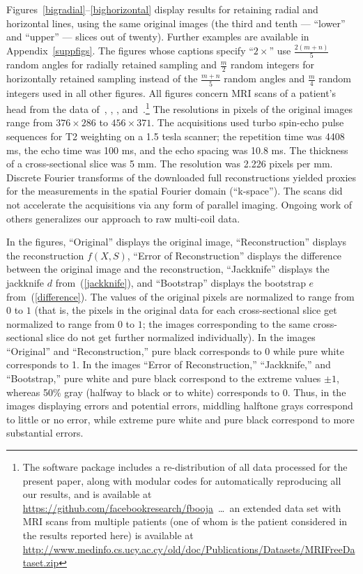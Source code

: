 \documentclass[article]{jdssv}
\begin{document}
Figures~\ref{bigradial}--\ref{bighorizontal} display results for retaining
radial and horizontal lines, using the same original images
(the third and tenth --- ``lower'' and ``upper'' --- slices out of twenty).
Further examples are available in Appendix~\ref{suppfigs}.
The figures whose captions specify ``$2\times$'' use
$\frac{2(m + n)}{5}$ random angles for radially retained sampling
and $\frac{m}{2}$ random integers for horizontally retained sampling
instead of the $\frac{m + n}{5}$ random angles
and $\frac{m}{4}$ random integers used in all other figures.
All figures concern MRI scans of a patient's head from the data
of~\citet{mri2}, \citet{mri1}, \citet{mri3},
and~\citet{mri4}.\footnote{The  software package 
includes a re-distribution of all data processed for the present paper,
along with modular codes for automatically reproducing all our results,
and is available at \url{https://github.com/facebookresearch/fbooja}\ \dots\ 
an extended data set with MRI scans from multiple patients (one of whom
is the patient considered in the results reported here) is available at
\url{http://www.medinfo.cs.ucy.ac.cy/old/doc/Publications/Datasets/MRIFreeDataset.zip}}
The resolutions in pixels of the original images range
from $376 \times 286$ to $456 \times 371$.
The acquisitions used turbo spin-echo pulse sequences for T2 weighting
on a 1.5 tesla scanner; the repetition time was 4408 ms,
the echo time was 100 ms, and the echo spacing was 10.8 ms.
The thickness of a cross-sectional slice was 5 mm.
The resolution was 2.226 pixels per mm.
Discrete Fourier transforms of the downloaded full reconstructions
yielded proxies for the measurements in the spatial Fourier domain
(``k-space'').
The scans did not accelerate the acquisitions via any form of parallel imaging.
Ongoing work of others generalizes our approach to raw multi-coil data.

In the figures,
``Original'' displays the original image,
``Reconstruction'' displays the reconstruction $f(X, S)$,
``Error of Reconstruction'' displays the difference between the original image
and the reconstruction,
``Jackknife'' displays the jackknife $d$ from~(\ref{jackknife}),
and ``Bootstrap'' displays the bootstrap $e$ from~(\ref{difference}).
The values of the original pixels are normalized to range from $0$ to $1$
(that is, the pixels in the original data for each cross-sectional slice
get normalized to range from $0$ to $1$; the images corresponding
to the same cross-sectional slice do not get further normalized individually).
In the images ``Original'' and ``Reconstruction,''
pure black corresponds to 0 while pure white corresponds to 1.
In the images ``Error of Reconstruction,'' ``Jackknife,'' and ``Bootstrap,''
pure white and pure black correspond to the extreme values $\pm 1$,
whereas 50\% gray (halfway to black or to white) corresponds to 0.
Thus, in the images displaying errors and potential errors,
middling halftone grays correspond to little or no error, while
extreme pure white and pure black correspond to more substantial errors.
\end{document}

